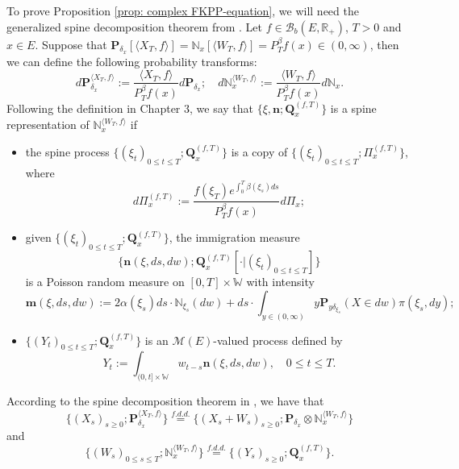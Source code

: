 \documentclass[UTF8]{pkuthss}
\theoremstyle{plain}
\theoremstyle{definition}
\numberwithin{equation}{section}
\begin{document}
    To prove Proposition \ref{prop: complex FKPP-equation}, we will need the generalized spine decomposition theorem from \cite{RenSongSun2017Spine}. 
    Let $f\in \mathcal B_b(E,\mathbb R_+)$, $T >0$ and $x\in E$.
    Suppose that $\mathbf P_{\delta_x}[\langle X_T, f\rangle] = \mathbb N_x[\langle W_T, f\rangle] = P^{\beta}_T f(x) \in (0,\infty)$, then we can define the following probability transforms:
\begin{equation}
    d\mathbf P_{\delta_x}^{\langle X_T, f\rangle}
    := \frac{\langle X_T, f\rangle}{P_T^{\beta} f(x)} d\mathbf P_{\delta_x};
    \quad d\mathbb N_x^{\langle W_T, f\rangle}
    :=  \frac{\langle W_T, f\rangle}{P_T^{\beta} f(x)} d\mathbb N_x.
\end{equation}
    Following the definition in Chapter 3, we say that $\{\xi, \mathbf n;\mathbf Q_{x}^{(f,T)}\}$ is a spine representation of $\mathbb N_x^{\langle W_T, f\rangle}$ if
\begin{itemize}
\item
    the spine process $\{(\xi_t)_{0\leq t\leq T}; \mathbf Q^{(f,T)}_x\}$ is a copy of $\{(\xi_t)_{0\leq t\leq T}; \Pi^{(f,T)}_{x}\}$,
    where
\begin{equation}
    d\Pi_x^{(f,T)} := \frac{f(\xi_T)e^{\int_0^T \beta(\xi_s)ds}}{P^{\beta}_T f(x)} d \Pi_x;
\end{equation}
\item
    given $\{(\xi_t)_{0\leq t\leq T}; \mathbf Q^{(f,T)}_x\}$, the immigration measure 
\[ \{\mathbf n(\xi,ds,dw); \mathbf Q^{(f,T)}_x[\cdot |(\xi_t)_{0\leq t\leq T}]\}\]
    is a Poisson random measure on $[0,T] \times \mathbb W$ with intensity
\begin{equation}
\label{eq: conditional intensity}
    \mathbf m(\xi,ds,dw)
    := 2 \alpha(\xi_s) ds \cdot \mathbb N_{\xi_s}(dw) + ds \cdot \int_{y\in (0,\infty)} y \mathbf P_{y\delta_{\xi_s}}(X\in dw) \pi(\xi_s,dy);
\end{equation}
\item
    $\{(Y_t)_{0\leq t\leq T}; \mathbf Q^{(f,T)}_x\}$ is an $\mathcal M(E)$-valued process defined by
\begin{equation}
    Y_t
    := \int_{(0,t] \times \mathbb W} w_{t-s} \mathbf n(\xi,ds,dw),
    \quad 0 \leq t\leq T.
\end{equation}
\end{itemize}
    According to the spine decomposition theorem in \cite{RenSongSun2017Spine}, we have that
\begin{equation}
\label{eq: Spine decomposition 1}
    \{(X_s)_{s \geq 0};\mathbf P_{\delta_x}^{\langle X_T, f\rangle}\}
    \overset{f.d.d.}{=} \{(X_s + W_s)_{s \geq 0};\mathbf P_{\delta_x} \otimes \mathbb N_x^{\langle W_T, f\rangle} \}
\end{equation}
    and
\begin{equation}
\label{eq: Spine decomposition 2}
    \{(W_s)_{0\leq s\leq T};\mathbb N_x^{\langle W_T, f\rangle}\}
    \overset{f.d.d.}{=} \{(Y_s)_{s \geq 0};\mathbf Q_x^{(f,T)}\}.
\end{equation}
\end{document}
